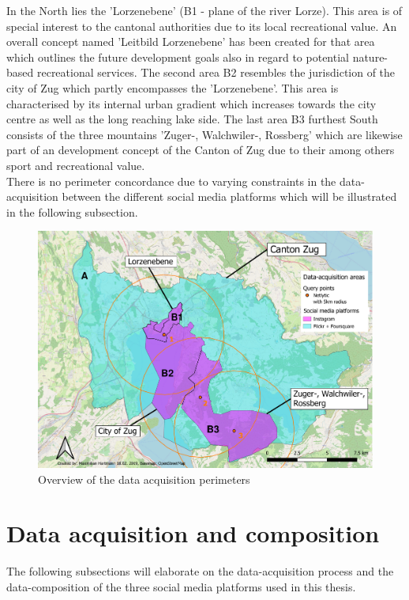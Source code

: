 In the North lies the 'Lorzenebene' (B1 - plane of the river Lorze). This area is of special interest to the cantonal authorities due to its local recreational value. An overall concept named 'Leitbild Lorzenebene'  \parencite{BaudirektiondesKantonsZug2012} has been created for that area which outlines the future development goals also in regard to potential nature-based recreational services. The second area B2 resembles the jurisdiction of the city of Zug which partly encompasses the 'Lorzenebene'. This area is characterised by its internal urban gradient which increases towards the city centre as well as the long reaching lake side. The last area B3 furthest South consists of the three mountains 'Zuger-, Walchwiler-, Rossberg' which are likewise part of an development concept \parencite{Berchtold2011} of the Canton of Zug due to their among others sport and recreational value. \\
There is no perimeter concordance due to varying constraints in the data-acquisition between the different social media platforms which will be illustrated in the following subsection.

\begin{figure}[h]
   \centering
   \includegraphics[width=\textwidth]{img/overview_research_area_w_Lorzenebene_edited.pdf}
   \caption{Overview of the data acquisition perimeters}
   \label{fig:research_area}
\end{figure}


\section{Data acquisition and composition} \label{data_acquisition}
The following subsections will elaborate on the data-acquisition process and the data-composition of the three social media platforms used in this thesis. 

